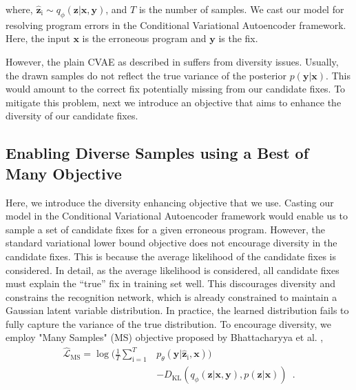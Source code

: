 \documentclass[runningheads]{llncs}
\begin{document}
\iffalse
\begin{equation}\label{eq:vae}\tag{3}
\hat{\mathcal{L}}_{\text{VAE}} = \frac{1}{T}\sum\limits_{\text{i}=1}^{T} \log( p_{\theta}(\textbf{x} | \hat{\textbf{z}}_{\text{i}}) )
 - D_\text{KL}({q_{\phi}(\textbf{z} | \textbf{x})},{p(\textbf{z})})\enspace{.}
\end{equation}
\fi

where, $\hat{\textbf{z}}_{\text{i}} \sim q_{\phi}(\textbf{z} | \textbf{x}, \textbf{y})$, and $T$ is the number of samples. We cast our model for resolving program errors in the Conditional Variational Autoencoder framework. Here, the input $\textbf{x}$ is the erroneous program and $\textbf{y}$ is the fix. 

However, the plain CVAE as described in \cite{cvae15sohn} suffers from diversity issues. Usually, the drawn samples do not reflect the true variance of the posterior $p(\textbf{y} | \textbf{x})$. This would amount to the correct fix potentially missing from our candidate fixes. To mitigate this problem, next we introduce an objective that aims to enhance the diversity of our candidate fixes. 

\subsection{Enabling Diverse Samples using a Best of Many Objective}
\label{subsec:samplefix}

Here, we introduce the diversity enhancing objective that we use. Casting our model in the Conditional Variational Autoencoder framework would enable us to sample a set of candidate fixes for a given erroneous program. However, the standard variational lower bound objective does not encourage diversity in the candidate fixes. This is because the average likelihood of the candidate fixes is considered. In detail, as the average likelihood is considered, all candidate fixes must explain the ``true'' fix in training set well. This discourages diversity and constrains the recognition network, which is already constrained to maintain a Gaussian latent variable distribution. In practice, the learned distribution fails to fully capture the variance of the true distribution. To encourage diversity, 
we employ "Many Samples" (MS) objective proposed by Bhattacharyya
et al. \cite{bhattacharyya2018accurate},
\begin{equation}\label{eq:ms}\tag{3}
    \begin{aligned}
    \hat{\mathcal{L}}_{\text{MS}} = \log \big(\frac{1}{T}\sum\limits_{\text{i}=1}^{T} & p_{\theta}(\textbf{y} | \hat{\textbf{z}}_{\text{i}}, \textbf{x})   \big) 
    \\&- D_\text{KL}({q_{\phi}(\textbf{z} | \textbf{x}, \textbf{y})},{p(\textbf{z} | \textbf{x})})\enspace{.}
    \end{aligned}
\end{equation}
\end{document}

